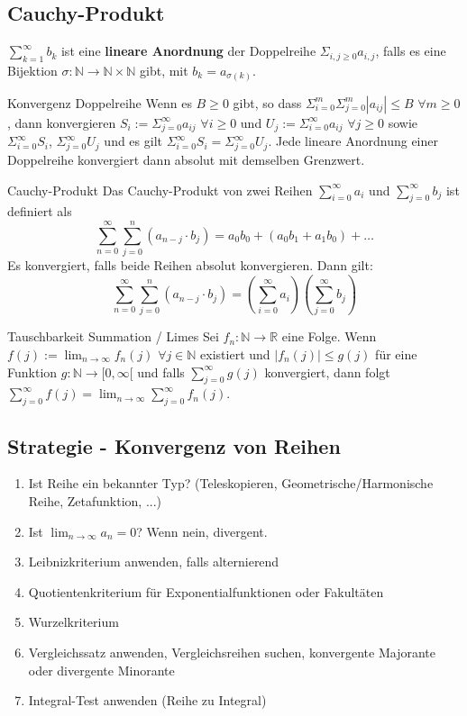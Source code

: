 \documentclass[a4paper,10pt]{article}
\def\limn{\lim_{n\to \infty}}
\def\sumk{\sum_{k=1}^\infty}
\begin{document}
\subsection{Cauchy-Produkt}
$\sumk b_k$ ist eine \textbf{lineare Anordnung} der Doppelreihe $\Sigma_{i,j \geq 0} a_{i,j}$, falls es eine Bijektion $\sigma : \mathbb{N} \rightarrow \mathbb{N} \times \mathbb{N}$ gibt, mit $b_k = a_{\sigma(k)}$.\\

\begin{subbox}{Konvergenz Doppelreihe}
  Wenn es $B \geq 0$ gibt, so dass $\Sigma_{i=0}^m \Sigma_{j=0}^m |a_{ij}| \leq B$ $\forall m \geq 0$, dann konvergieren $S_i := \Sigma_{j=0}^\infty a_{ij}$ $\forall i \geq 0$ und $U_j := \Sigma_{i=0}^\infty a_{ij}$ $\forall j \geq 0$ sowie $\Sigma_{i=0}^\infty S_i$, $\Sigma_{j=0}^\infty U_j$ und es gilt $\Sigma_{i=0}^\infty S_i = \Sigma_{j=0}^\infty U_j$. Jede lineare Anordnung einer Doppelreihe konvergiert dann absolut mit demselben Grenzwert.
\end{subbox}

\begin{mainbox}{Cauchy-Produkt}
  Das Cauchy-Produkt von zwei Reihen $\sum_{i = 0}^\infty a_i$ und $\sum_{j = 0}^\infty b_j$ ist definiert als
  $$\sum_{n=0}^\infty \sum_{j=0}^n (a_{n-j} \cdot b_j) = a_0b_0 + (a_0b_1 + a_1b_0) + \ldots$$ Es konvergiert, falls beide Reihen absolut konvergieren. Dann gilt:\\
  $$\sum_{n=0}^\infty \sum_{j=0}^n (a_{n-j} \cdot b_j) = (\sum_{i=0}^\infty a_i) (\sum_{j=0}^\infty b_j)$$
\end{mainbox}

\begin{subbox}{Tauschbarkeit Summation / Limes}
  Sei $f_n : \mathbb{N} \rightarrow \mathbb{R}$ eine Folge. Wenn $f(j) := \limn f_n(j)$ $\forall j \in \mathbb{N}$ existiert und $|f_n(j)| \leq g(j)$ für eine Funktion $g: \mathbb{N} \rightarrow \mathbb [0, \infty[$ und falls $\sum_{j=0}^\infty g(j)$ konvergiert, dann folgt $\sum_{j=0}^\infty f(j) = \limn \sum_{j=0}^\infty f_n(j)$.
\end{subbox}


\subsection{Strategie - Konvergenz von Reihen}
\begin{enumerate}
 \item Ist Reihe ein bekannter Typ? (Teleskopieren, Geometrische/Harmonische Reihe, Zetafunktion, ...)
 \item Ist $\limn a_n = 0$? Wenn nein, divergent.
 \item Leibnizkriterium anwenden, falls alternierend
 \item Quotientenkriterium für Exponentialfunktionen oder Fakultäten
 \item Wurzelkriterium
 \item Vergleichssatz anwenden, Vergleichsreihen suchen, konvergente Majorante oder divergente Minorante
 \item Integral-Test anwenden (Reihe zu Integral)
\end{enumerate}
\end{document}
